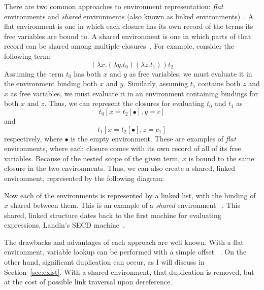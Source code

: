 There are two common approaches to environment representation: \emph{flat}
environments and \emph{shared} environments (also known as linked
environments)~\cite{appel1988optimizing,shao1994space}. A flat environment is
one in which each closure has its own record of the terms its free variables are
bound to. A shared environment is one in which parts of that record can be
shared among multiple closures~\cite{appel1988optimizing,shao1994space}. For
example, consider the following term: $$(\lambda x.(\lambda y.t_0) (\lambda
z.t_1)) t_2$$ Assuming the term $t_0$ has both $x$ and $y$ as free variables, we
must evaluate it in the environment binding both $x$ and $y$.  Similarly,
assuming $t_1$ contains both $z$ and $x$ as free variables, we must evaluate it
in an environment containing bindings for both $x$ and $z$. Thus, we can
represent the closures for evaluating $t_0$ and $t_1$  as $$t_0[x=t_2[\bullet],
y=c]$$ and $$t_1[x=t_2[\bullet], z=c_1]$$ respectively, where $\bullet$ is the
empty environment.  These are examples of \emph{flat} environments, where each
closure comes with its own record of all of its free variables. Because of the
nested scope of the given term, $x$ is bound to the same closure in the two
environments. Thus, we can also create a shared, linked environment,
represented by the following diagram:

\begin{center}
\end{center}
Now each of the environments is represented by a linked list, with the binding
of $x$ shared between them. This is an example of a \emph{shared} environment
~\cite{appel1988optimizing}. This shared, linked structure dates back to the 
first machine for evaluating expressions, Landin's SECD
machine~\cite{landin1964mechanical}.

The drawbacks and advantages of each approach are well known. With a flat
environment, variable lookup can be performed with a simple offset
~\cite{jonesstg,appel1992compiling}. On the other hand, significant
duplication can occur, as I will discuss in Section~\ref{sec:exist}.
With a shared environment, that duplication is removed, but at the cost of
possible link traversal upon dereference. 

